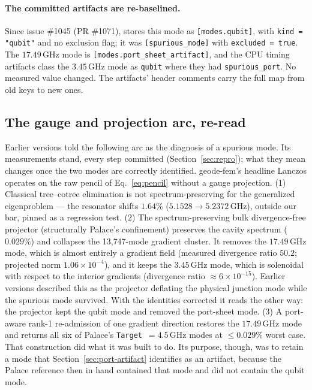 \documentclass{anvil-paper}
\begin{document}
\paragraph{The committed artifacts are re-baselined.}
Since issue \#1045 (PR \#1071),
 stores this mode as
\texttt{[modes.qubit]}, with \texttt{kind = "qubit"} and no exclusion
flag; it was \texttt{[spurious\_mode]} with \texttt{excluded = true}.
The $17.49$\,GHz mode is \texttt{[modes.port\_sheet\_artifact]}, and the
CPU timing artifacts class the $3.45$\,GHz mode as \texttt{qubit} where
they had \texttt{spurious\_port}. No measured value changed. The
artifacts' header comments carry the full map from old keys to new
ones.

\subsection{The gauge and projection arc, re-read}
\label{sec:gauge-arc}

Earlier versions told the following arc as the diagnosis of a spurious
mode. Its measurements stand, every step committed
(Section~\ref{sec:repro}); what they mean changes once the two modes are
correctly identified. geode-fem's headline Lanczos operates on the raw
pencil of Eq.~\ref{eq:pencil} without a gauge projection. (1) Classical
tree--cotree elimination
\citep{albanese1988solution,manges1995generalized} is not
spectrum-preserving for the generalized eigenproblem --- the resonator
shifts $1.64\%$ ($5.1528 \to 5.2372$\,GHz), outside our bar, pinned as a
regression test. (2) The spectrum-preserving bulk divergence-free
projector (structurally Palace's confinement) preserves the cavity
spectrum ($0.029\%$) and collapses the 13{,}747-mode gradient cluster.
It removes the $17.49$\,GHz mode, which is almost entirely a gradient
field (measured divergence ratio $50.2$; projected norm
$1.06\times10^{-4}$), and it keeps the $3.45$\,GHz mode, which is
solenoidal with respect to the interior gradients (divergence ratio
${\approx}6\times10^{-15}$). Earlier versions described this as the
projector deflating the physical junction mode while the spurious mode
survived. With the identities corrected it reads the other way: the
projector kept the qubit mode and removed the port-sheet mode. (3) A
port-aware rank-1 re-admission of one gradient direction restores the
$17.49$\,GHz mode and returns all six of Palace's
\texttt{Target}~$= 4.5$\,GHz modes at $\leq 0.029\%$ worst case. That
construction did what it was built to do. Its purpose, though, was to
retain a mode that Section~\ref{sec:port-artifact} identifies as an
artifact, because the Palace reference then in hand contained that mode
and did not contain the qubit mode.
\end{document}
